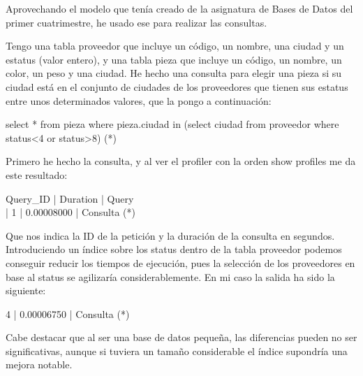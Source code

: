 \documentclass[a4paper, 11pt]{article} %
\begin{document}
Aprovechando el modelo que tenía creado de la asignatura de Bases de Datos del primer cuatrimestre, he usado ese para realizar las consultas. 

Tengo una tabla proveedor que incluye un código, un nombre, una ciudad y un estatus (valor entero), y una tabla pieza que incluye un código, un nombre, un color, un peso y una ciudad. He hecho una consulta para elegir una pieza si su ciudad está en el conjunto de ciudades de los proveedores que tienen sus estatus entre unos determinados valores, que la pongo a continuación: 

select * from pieza where pieza.ciudad in (select ciudad from proveedor where status<4 or status>8) (*)

Primero he hecho la consulta, y al ver el profiler con la orden show profiles me da este resultado: 

 Query\_ID | Duration   | Query \\
 |        1 | 0.00008000 | Consulta (*)
 
Que nos indica la ID de la petición y la duración de la consulta en segundos. Introduciendo un índice sobre los status dentro de la tabla proveedor podemos conseguir reducir los tiempos de ejecución, pues la selección de los proveedores en base al status se agilizaría considerablemente. En mi caso la salida ha sido la siguiente: 

 4 | 0.00006750 | Consulta (*)

Cabe destacar que al ser una base de datos pequeña, las diferencias pueden no ser significativas, aunque si tuviera un tamaño considerable el índice supondría una mejora notable. 
\end{document}
